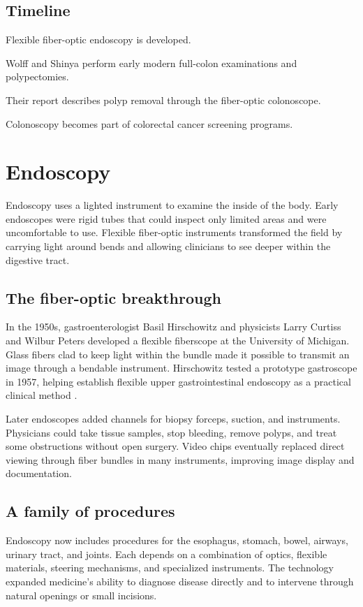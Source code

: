 \documentclass[12pt,oneside]{book}
\begin{document}
\section*{Timeline}
\begin{description}[leftmargin=2.3cm,style=nextline]
  \item[1950s] Flexible fiber-optic endoscopy is developed.
  \item[1969] Wolff and Shinya perform early modern full-colon examinations and polypectomies.
  \item[1973] Their report describes polyp removal through the fiber-optic colonoscope.
  \item[Late twentieth century] Colonoscopy becomes part of colorectal cancer screening programs.
\end{description}
\chapter[Endoscopy]{Endoscopy}

Endoscopy uses a lighted instrument to examine the inside of the body. Early
endoscopes were rigid tubes that could inspect only limited areas and were
uncomfortable to use. Flexible fiber-optic instruments transformed the field
by carrying light around bends and allowing clinicians to see deeper within
the digestive tract.

\section{The fiber-optic breakthrough}
In the 1950s, gastroenterologist Basil Hirschowitz and physicists Larry Curtiss and Wilbur Peters developed a flexible fiberscope at the University of Michigan. Glass fibers clad to keep light within the bundle made it possible to transmit an image through a bendable instrument. Hirschowitz tested a prototype gastroscope in 1957, helping establish flexible upper gastrointestinal endoscopy as a practical clinical method \cite{endoscopyHistory}.

Later endoscopes added channels for biopsy forceps, suction, and instruments.
Physicians could take tissue samples, stop bleeding, remove polyps, and treat
some obstructions without open surgery. Video chips eventually replaced direct
viewing through fiber bundles in many instruments, improving image display and
documentation.

\section{A family of procedures}
Endoscopy now includes procedures for the esophagus, stomach, bowel, airways, urinary tract, and joints. Each depends on a combination of optics, flexible materials, steering mechanisms, and specialized instruments. The technology expanded medicine's ability to diagnose disease directly and to intervene through natural openings or small incisions.
\end{document}

